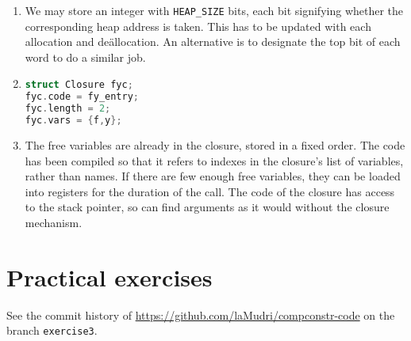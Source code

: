 \documentclass{article}
\begin{document}
\begin{enumerate}
\begin{enumerate}
      \item We may store an integer with \texttt{HEAP\_SIZE} bits, each bit signifying whether the corresponding heap address is taken. This has to be updated with each allocation and de\"allocation. An alternative is to designate the top bit of each word to do a similar job.
      \item
        \begin{lstlisting}[language=C]
struct Closure fyc;
fyc.code = fy_entry;
fyc.length = 2;
fyc.vars = {f,y};
        \end{lstlisting}
      \item The free variables are already in the closure, stored in a fixed order. The code has been compiled so that it refers to indexes in the closure's list of variables, rather than names. If there are few enough free variables, they can be loaded into registers for the duration of the call. The code of the closure has access to the stack pointer, so can find arguments as it would without the closure mechanism.
    \end{enumerate}
\end{enumerate}

\section*{Practical exercises}
See the commit history of \url{https://github.com/laMudri/compconstr-code} on the branch \texttt{exercise3}.
\end{document}

